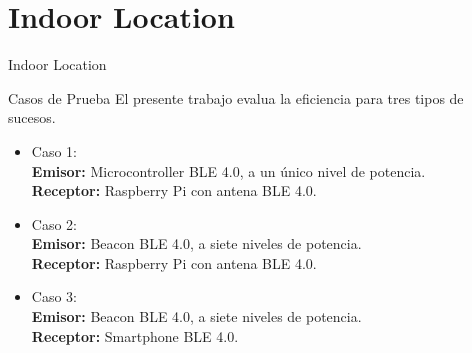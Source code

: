 \documentclass[10pt]{beamer}
\begin{document}
\section{Indoor Location}
\begin{frame}{Indoor Location}{}
\begin{block}{Casos de Prueba}
El presente trabajo evalua la eficiencia para tres tipos de sucesos.\\
\begin{itemize}
	\item Caso 1:\\
	\textbf{Emisor:} Microcontroller BLE 4.0, a un único nivel de potencia.\\
	\textbf{Receptor:} Raspberry Pi con antena BLE 4.0.
	
	\item Caso 2:\\
	\textbf{Emisor:} Beacon BLE 4.0, a siete niveles de potencia.\\
	\textbf{Receptor:} Raspberry Pi con antena BLE 4.0.
	
	\item Caso 3:\\
	\textbf{Emisor:} Beacon BLE 4.0, a siete niveles de potencia.\\
	\textbf{Receptor:} Smartphone BLE 4.0.
\end{itemize}
\end{block}
\end{frame}
\end{document}
